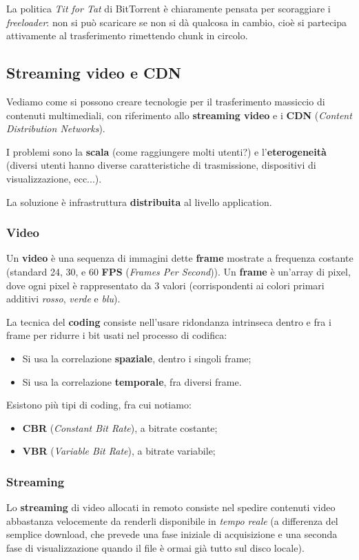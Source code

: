\documentclass[a4paper,11pt]{article}
\begin{document}
La politica \textit{Tit for Tat} di BitTorrent è chiaramente pensata per scoraggiare i \textit{freeloader}: non si può scaricare se non si dà qualcosa in cambio, cioè si partecipa attivamente al trasferimento rimettendo chunk in circolo.

\subsection{Streaming video e CDN}
Vediamo come si possono creare tecnologie per il trasferimento massiccio di contenuti multimediali, con riferimento allo \textbf{streaming video} e i \textbf{CDN} (\textit{Content Distribution Networks}).

I problemi sono la \textbf{scala} (come raggiungere molti utenti?) e l'\textbf{eterogeneità} (diversi utenti hanno diverse caratteristiche di trasmissione, dispositivi di visualizzazione, ecc...).

La soluzione è infrastruttura \textbf{distribuita} al livello application.

\subsubsection{Video}
Un \textbf{video} è una sequenza di immagini dette \textbf{frame} mostrate a frequenza costante (standard 24, 30, e 60 \textbf{FPS} (\textit{Frames Per Second})).
Un \textbf{frame} è un'array di pixel, dove ogni pixel è rappresentato da 3 valori (corrispondenti ai colori primari additivi \textit{rosso}, \textit{verde} e \textit{blu}).

La tecnica del \textbf{coding} consiste nell'usare ridondanza intrinseca dentro e fra i frame per ridurre i bit usati nel processo di codifica:
\begin{itemize}
	\item Si usa la correlazione \textbf{spaziale}, dentro i singoli frame;
	\item Si usa la correlazione \textbf{temporale}, fra diversi frame.
\end{itemize}

Esistono più tipi di coding, fra cui notiamo:
\begin{itemize}
	\item \textbf{CBR} (\textit{Constant Bit Rate}), a bitrate costante;
	\item \textbf{VBR} (\textit{Variable Bit Rate}), a bitrate variabile;
\end{itemize}

\subsubsection{Streaming}
Lo \textbf{streaming} di video allocati in remoto consiste nel spedire contenuti video abbastanza velocemente da renderli disponibile in \textit{tempo reale} (a differenza del semplice download, che prevede una fase iniziale di acquisizione e una seconda fase di visualizzazione quando il file è ormai già tutto sul disco locale).
\end{document}
